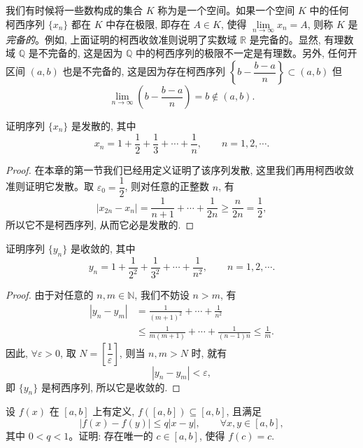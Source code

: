 \begin{remark}\label{remark:ma-2-source-95}
我们有时候将一些数构成的集合 $K$ 称为是一个空间。如果一个空间 $K$ 中的任何柯西序列 $\{x_n\}$ 都在 $K$ 中存在极限, 即存在 $A\in K$, 使得 $\lim\limits_{n\to\infty}x_n=A$, 则称 $K$ 是\emph{完备的}。例如, 上面证明的柯西收敛准则说明了实数域 $\mathbb{R}$ 是完备的。显然, 有理数域 $\mathbb{Q}$ 是不完备的, 这是因为 $\mathbb{Q}$ 中的柯西序列的极限不一定是有理数。另外, 任何开区间 $(a,b)$ 也是不完备的, 这是因为存在柯西序列 $\left\{b-\dfrac{b-a}{n}\right\}\subset(a,b)$ 但
\[
  \lim_{n\to\infty}\left(b-\frac{b-a}{n}\right)=b\notin(a,b).
\]
\end{remark}


\begin{example}\label{example:ma-2-4-8}
证明序列 $\{x_n\}$ 是发散的, 其中
\[
  x_n=1+\frac12+\frac13+\cdots+\frac1n,\qquad n=1,2,\cdots.
\]
\end{example}


\begin{proof}
在本章的第一节我们已经用定义证明了该序列发散, 这里我们再用柯西收敛准则证明它发散。取 $\varepsilon_0=\dfrac12$, 则对任意的正整数 $n$, 有
\[
  |x_{2n}-x_n|
  =
  \frac1{n+1}+\cdots+\frac1{2n}
  \geqslant \frac n{2n}=\frac12,
\]
所以它不是柯西序列, 从而它必是发散的.
\end{proof}


\begin{example}\label{example:ma-2-4-9}
证明序列 $\{y_n\}$ 是收敛的, 其中
\[
  y_n=1+\frac1{2^2}+\frac1{3^2}+\cdots+\frac1{n^2},\qquad n=1,2,\cdots.
\]
\end{example}


\begin{proof}
由于对任意的 $n,m\in\mathbb{N}$, 我们不妨设 $n>m$, 有
\[
\begin{aligned}
  |y_n-y_m|
  &=
  \frac1{(m+1)^2}+\cdots+\frac1{n^2}\\
  &\leqslant
  \frac1{m(m+1)}+\cdots+\frac1{(n-1)n}
  \leqslant \frac1m.
\end{aligned}
\]
因此, $\forall\varepsilon>0$, 取 $N=\left[\dfrac1\varepsilon\right]$, 则当 $n,m>N$ 时, 就有
\[
  |y_n-y_m|<\varepsilon,
\]
即 $\{y_n\}$ 是柯西序列, 所以它是收敛的.
\end{proof}


\begin{example}[{压缩映像原理}]\label{example:ma-2-4-10}
设 $f(x)$ 在 $[a,b]$ 上有定义, $f([a,b])\subseteq[a,b]$, 且满足
\[
  |f(x)-f(y)|\leqslant q|x-y|,\qquad \forall x,y\in[a,b],
\]
其中 $0<q<1$。证明: 存在唯一的 $c\in[a,b]$, 使得 $f(c)=c$.
\end{example}


